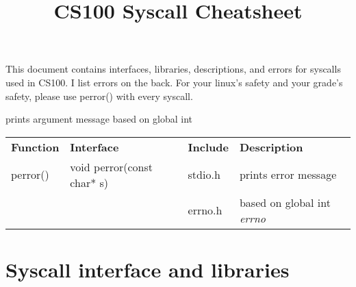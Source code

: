 \documentclass{article}
\title{CS100 Syscall Cheatsheet}
\author{}
\date{}
\begin{document}
\maketitle

\large This document contains interfaces, libraries, descriptions, and errors for 
syscalls used in CS100. I list errors on the back. For your linux's safety and 
your grade's safety, please use perror() with every syscall.

\smallskip
{} %
 prints argument message  based on global int 


\medskip
\begin{tabular}{llll}
    \bf Function & \bf Interface & \bf Include & \bf Description\\
    perror() & void perror(const char* s) &  stdio.h &  prints error message\\
    && errno.h & based on global int \it errno \rm
\end{tabular}
\normalsize

\section{Syscall interface and libraries}
\end{document}
